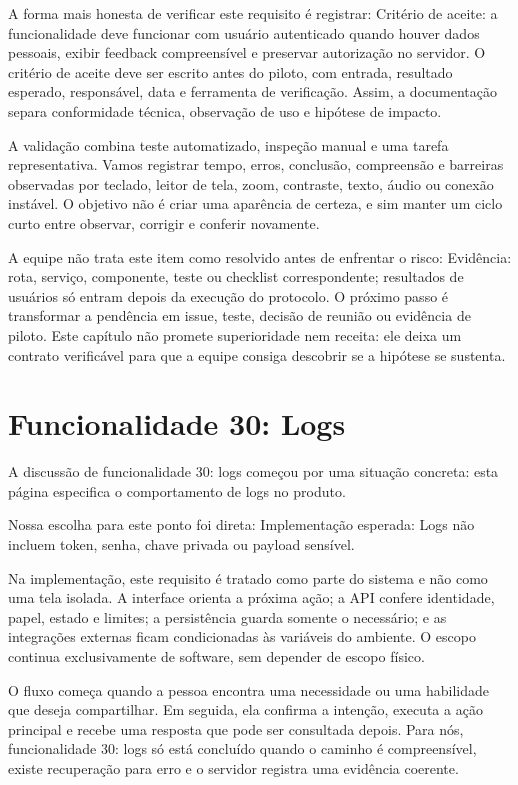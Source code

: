 \documentclass[12pt,oneside,a4paper,article]{abntex2}
\begin{document}
A forma mais honesta de verificar este requisito é registrar: Critério de aceite: a funcionalidade deve funcionar com usuário autenticado quando houver dados pessoais, exibir feedback compreensível e preservar autorização no servidor. O critério de aceite deve ser escrito antes do piloto, com entrada, resultado esperado, responsável, data e ferramenta de verificação. Assim, a documentação separa conformidade técnica, observação de uso e hipótese de impacto.

A validação combina teste automatizado, inspeção manual e uma tarefa representativa. Vamos registrar tempo, erros, conclusão, compreensão e barreiras observadas por teclado, leitor de tela, zoom, contraste, texto, áudio ou conexão instável. O objetivo não é criar uma aparência de certeza, e sim manter um ciclo curto entre observar, corrigir e conferir novamente.

A equipe não trata este item como resolvido antes de enfrentar o risco: Evidência: rota, serviço, componente, teste ou checklist correspondente; resultados de usuários só entram depois da execução do protocolo. O próximo passo é transformar a pendência em issue, teste, decisão de reunião ou evidência de piloto. Este capítulo não promete superioridade nem receita: ele deixa um contrato verificável para que a equipe consiga descobrir se a hipótese se sustenta.

\section{Funcionalidade 30: Logs}
A discussão de funcionalidade 30: logs começou por uma situação concreta: esta página especifica o comportamento de logs no produto.

Nossa escolha para este ponto foi direta: Implementação esperada: Logs não incluem token, senha, chave privada ou payload sensível.

Na implementação, este requisito é tratado como parte do sistema e não como uma tela isolada. A interface orienta a próxima ação; a API confere identidade, papel, estado e limites; a persistência guarda somente o necessário; e as integrações externas ficam condicionadas às variáveis do ambiente. O escopo continua exclusivamente de software, sem depender de escopo físico.

O fluxo começa quando a pessoa encontra uma necessidade ou uma habilidade que deseja compartilhar. Em seguida, ela confirma a intenção, executa a ação principal e recebe uma resposta que pode ser consultada depois. Para nós, funcionalidade 30: logs só está concluído quando o caminho é compreensível, existe recuperação para erro e o servidor registra uma evidência coerente.
\end{document}
